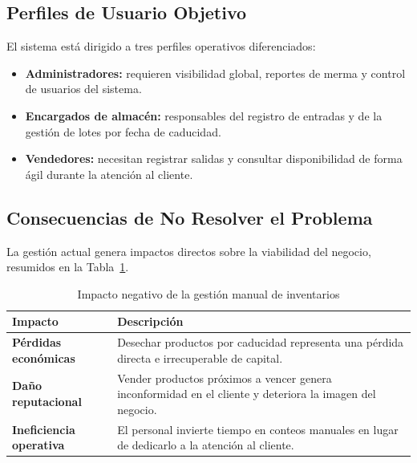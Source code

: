 \documentclass[journal]{IEEEtran}
\begin{document}
	\subsection{Perfiles de Usuario Objetivo}
	\label{subsec:usuarios}
	
	El sistema est\'{a} dirigido a tres perfiles operativos diferenciados:
	
	\begin{itemize}[leftmargin=*, label=\textbullet, itemsep=2pt]
		\item \textbf{Administradores:} requieren visibilidad global,
		reportes de merma y control de usuarios del sistema.
		
		\item \textbf{Encargados de almac\'{e}n:} responsables del registro
		de entradas y de la gesti\'{o}n de lotes por fecha de caducidad.
		
		\item \textbf{Vendedores:} necesitan registrar salidas y consultar
		disponibilidad de forma \'{a}gil durante la atenci\'{o}n al cliente.
	\end{itemize}
	
	\subsection{Consecuencias de No Resolver el Problema}
	\label{subsec:consecuencias}
	
	La gesti\'{o}n actual genera impactos directos sobre la viabilidad del
	negocio, resumidos en la Tabla~\ref{tab:impacto}.
	
	\begin{table}[htbp]
		\renewcommand{\arraystretch}{1.35}
		\caption{Impacto negativo de la gesti\'{o}n manual de inventarios}
		\label{tab:impacto}
		\centering
		\begin{tabular}{>{\bfseries}p{2.4cm} p{5.2cm}}
			\toprule
			Impacto & Descripci\'{o}n \\
			\midrule
			P\'{e}rdidas econ\'{o}micas
			& Desechar productos por caducidad representa
			una p\'{e}rdida directa e irrecuperable de capital. \\[3pt]
			Da\~{n}o reputacional
			& Vender productos pr\'{o}ximos a vencer genera
			inconformidad en el cliente y deteriora la imagen
			del negocio. \\[3pt]
			Ineficiencia operativa
			& El personal invierte tiempo en conteos manuales
			en lugar de dedicarlo a la atenci\'{o}n al cliente. \\
			\bottomrule
		\end{tabular}
	\end{table}
	
\end{document}
